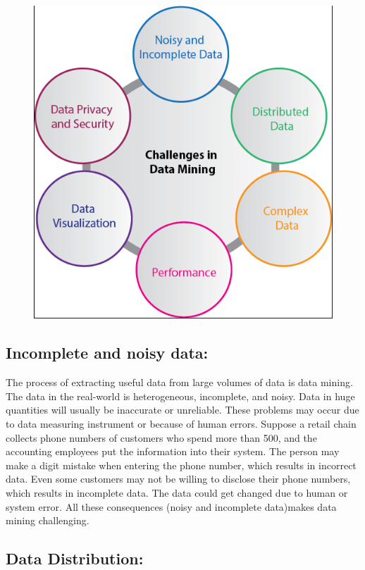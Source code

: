 \documentclass[a4paper,10pt]{article}
\begin{document}
\begin{figure}[H]
	\centering
	\includegraphics[width=\linewidth]{CData.png}
\end{figure}
\newpage
\subsection{Incomplete and noisy data:}


The process of extracting useful data from large volumes of data is data mining. The data in the real-world is heterogeneous, incomplete, and noisy. Data in huge quantities will usually be inaccurate or unreliable. These problems may occur due to data measuring instrument or because of human errors. Suppose a retail chain collects phone numbers of customers who spend more than 500, and the accounting employees put the information into their system. The person may make a digit mistake when entering the phone number, which results in incorrect data. Even some customers may not be willing to disclose their phone numbers, which results in incomplete data. The data could get changed due to human or system error. All these consequences (noisy and incomplete data)makes data mining challenging.

\subsection{Data Distribution:}
\end{document}

